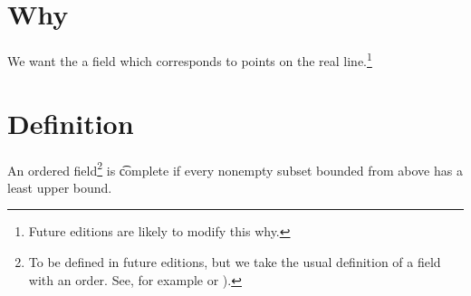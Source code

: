 

\section*{Why}

We want the a field which corresponds to points on the real line.\footnote{Future editions are likely to modify this why.}

\section*{Definition}

An ordered field\footnote{To be defined in future editions, but we take the usual definition of a field with an order. See, for example or ).}
is \t{complete} if every nonempty subset bounded from above has a least upper bound.

\blankpage